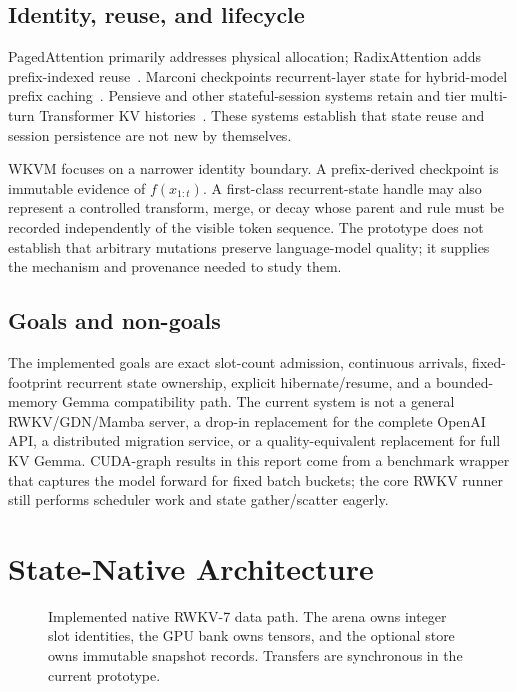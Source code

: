 \documentclass[10pt,letterpaper]{article}
\newcommand{\wkvm}{\textsc{WKVM}}
\begin{document}
\subsection{Identity, reuse, and lifecycle}

PagedAttention primarily addresses physical allocation; RadixAttention adds
prefix-indexed reuse~\cite{vllm,sglang}.  Marconi checkpoints recurrent-layer
state for hybrid-model prefix caching~\cite{marconi}.  Pensieve and other
stateful-session systems retain and tier multi-turn Transformer KV
histories~\cite{pensieve}.  These systems establish that state reuse and session
persistence are not new by themselves.

\wkvm{} focuses on a narrower identity boundary.  A prefix-derived checkpoint is
immutable evidence of $f(x_{1:t})$.  A first-class recurrent-state handle may
also represent a controlled transform, merge, or decay whose parent and rule
must be recorded independently of the visible token sequence.  The prototype
does not establish that arbitrary mutations preserve language-model quality;
it supplies the mechanism and provenance needed to study them.

\subsection{Goals and non-goals}

The implemented goals are exact slot-count admission, continuous arrivals,
fixed-footprint recurrent state ownership, explicit hibernate/resume, and a
bounded-memory Gemma compatibility path.  The current system is not a general
RWKV/GDN/Mamba server, a drop-in replacement for the complete OpenAI API, a
distributed migration service, or a quality-equivalent replacement for full
KV Gemma.  CUDA-graph results in this report come from a benchmark wrapper that
captures the model forward for fixed batch buckets; the core RWKV runner still
performs scheduler work and state gather/scatter eagerly.

\section{State-Native Architecture}

\begin{figure}[t]
\centering
{}
\caption{Implemented native RWKV-7 data path.  The arena owns integer slot
identities, the GPU bank owns tensors, and the optional store owns immutable
snapshot records.  Transfers are synchronous in the current prototype.}
\label{fig:architecture}
\end{figure}
\end{document}
